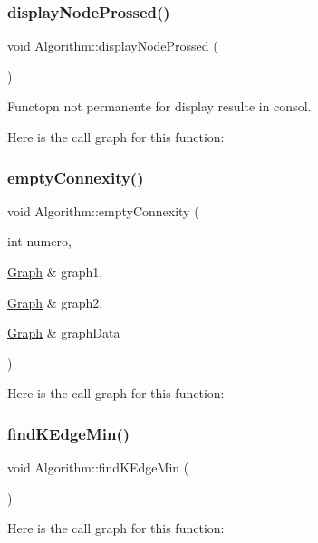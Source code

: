 \subsubsection{\texorpdfstring{display\+Node\+Prossed()}{displayNodeProssed()}}
{\footnotesize\ttfamily void Algorithm\+::display\+Node\+Prossed (\begin{DoxyParamCaption}{ }\end{DoxyParamCaption})}



Functopn not permanente for display resulte in consol. 

Here is the call graph for this function\+:
\mbox{\label{struct_algorithm_a363b2a9d18b83cf776182996ed9b1b91}} 
\subsubsection{\texorpdfstring{empty\+Connexity()}{emptyConnexity()}}
{\footnotesize\ttfamily void Algorithm\+::empty\+Connexity (\begin{DoxyParamCaption}\item[{int}]{numero,  }\item[{\mbox{\hyperlink{class_graph}{Graph}} \&}]{graph1,  }\item[{\mbox{\hyperlink{class_graph}{Graph}} \&}]{graph2,  }\item[{\mbox{\hyperlink{class_graph}{Graph}} \&}]{graph\+Data }\end{DoxyParamCaption})}

Here is the call graph for this function\+:
\mbox{\label{struct_algorithm_ae0961d8c30105f3ea9db598f2548bdb9}} 
\subsubsection{\texorpdfstring{find\+K\+Edge\+Min()}{findKEdgeMin()}}
{\footnotesize\ttfamily void Algorithm\+::find\+K\+Edge\+Min (\begin{DoxyParamCaption}{ }\end{DoxyParamCaption})}

Here is the call graph for this function\+:
\mbox{\label{struct_algorithm_aefee9c99eb1f0f26a2bda2021cc5c99e}} 
